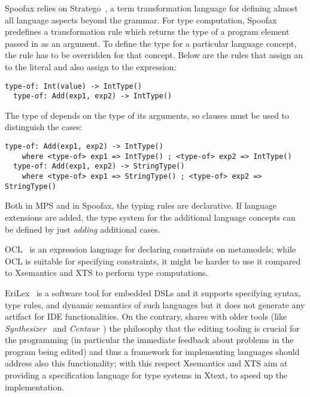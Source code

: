 
Spoofax relies on Stratego~\cite{Stratego2008}, a term transformation language
for defining almost all language aspects beyond the grammar. For type computation,
Spoofax predefines a transformation rule  which returns the type of
a program element passed in as an argument. To define the type for a
particular language concept, the  rule has to be overridden for that
concept. Below are the rules that assign an  to the
 literal and also assign  to the  expression:

\begin{lstlisting}[language=Spoofax]
  type-of: Int(value) -> IntType()
  type-of: Add(exp1, exp2) -> IntType()
\end{lstlisting}

The type of  depends on the type of its arguments, so  clauses
must be used to distinguish the cases:

\begin{lstlisting}[language=Spoofax]
  type-of: Add(exp1, exp2) -> IntType()
    where <type-of> exp1 => IntType() ; <type-of> exp2 => IntType()
  type-of: Add(exp1, exp2) -> StringType()
    where <type-of> exp1 => StringType() ; <type-of> exp2 => StringType()
\end{lstlisting}

Both in MPS and in Spoofax, the typing rules are declarative. If language
extensions are added, the type system for the additional language concepts can be defined by
just \emph{adding} additional cases.










OCL~\cite{WarmerKleppe99,OCLOMG} is an expression language for declaring
constraints on metamodels; while OCL is suitable for specifying constraints, it
might be harder to use it compared to Xsemantics and XTS to perform type
computations.

EriLex~\cite{EriLex} is a software tool for embedded DSLs and it supports
specifying syntax, type rules, and dynamic semantics of such languages but it
does not generate any artifact for IDE functionalities.
On the contrary, \xtext{} shares with older tools (like
\emph{Synthesizer}~\cite{Synthesizer} and \emph{Centaur}~\cite{Centaur}) the
philosophy that the editing tooling is crucial for the programming (in
particular the immediate feedback about problems in the program being edited)
and thus a framework for implementing languages should address also this
functionality; with this respect Xsemantics and XTS aim at providing a
specification language for type systems in Xtext, to speed up the
implementation.

